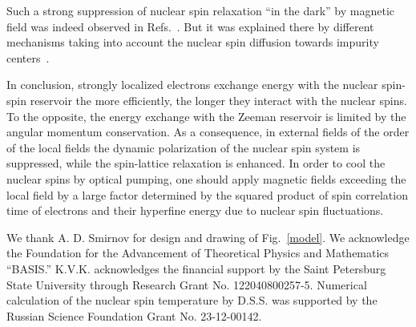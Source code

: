 \documentclass[prl,nobibnotes,twocolumn,aps,longbibliography,superscriptaddress,notoc]{revtex4-1}
\let\ifr\i
\renewcommand{\i}{{\rm i}}
\begin{document}
Such a strong suppression of nuclear spin relaxation ``in the dark'' by magnetic field was indeed observed in Refs.~. But it was explained there by different mechanisms taking into account the nuclear spin diffusion towards impurity centers~\cite{Khutsishvili}.

In conclusion, strongly localized electrons exchange energy with the nuclear spin-spin reservoir the more efficiently, the longer they interact with the nuclear spins. To the opposite, the energy exchange with the Zeeman reservoir is limited by the angular momentum conservation. As a consequence, in external fields of the order of the local fields the dynamic polarization of the nuclear spin system is suppressed, while the spin-lattice relaxation is enhanced. In order to cool the nuclear spins by optical pumping, one should apply magnetic fields exceeding the local field by a large factor determined by the squared product of spin correlation time of electrons and their hyperfine energy due to nuclear spin fluctuations.

\let\oldaddcontentsline\addcontentsline
\renewcommand{\addcontentsline}[3]{}

We thank A. D. Smirnov for design and drawing of Fig.~\ref{model}. We acknowledge the Foundation for the Advancement of Theoretical Physics and Mathematics “BASIS.” K.V.K. acknowledges the financial support by the Saint Petersburg State University through Research Grant No. 122040800257-5. Numerical calculation of the nuclear spin temperature by D.S.S. was supported by the Russian Science Foundation Grant No. 23-12-00142.

\renewcommand{\i}{\ifr}
\end{document}
